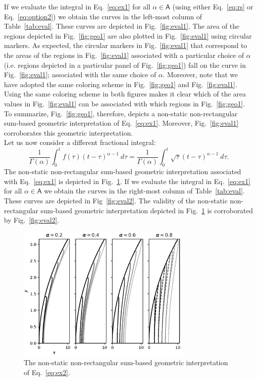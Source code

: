\documentclass{article}
\theoremstyle{theorem}
\theoremstyle{definition}
\begin{document}
\noindent
If we evaluate the integral in Eq.~\eqref{eq:ex1} for all $\alpha\in \mathsf{A}$ (using either Eq.~\eqref{eq:rs} or Eq.~\eqref{eq:option2}) we obtain the curves in the 
left-most column of Table~\ref{tab:eval}. These curves are depicted in Fig.~\ref{fig:eval1}.
The area of the regions depicted in Fig.~\ref{fig:geo1} are also plotted in Fig.~\ref{fig:eval1} using circular markers. As expected, the circular markers in Fig.~\ref{fig:eval1} that correspond to the areas of the regions in Fig.~\ref{fig:eval1}  
associated with a particular choice of $\alpha$ (i.e. regions depicted in a particular panel of Fig.~\ref{fig:geo1}) fall on the curve in Fig.~\ref{fig:eval1}; associated with the same choice of $\alpha$. Moreover, note that we have adopted the 
same coloring scheme in Fig.~\ref{fig:geo1} and Fig.~\ref{fig:eval1}. Using the same coloring scheme in both figures makes it clear which of the area values in Fig.~\ref{fig:eval1} can be associated with which regions in Fig.~\ref{fig:geo1}.
To summarize, Fig.~\ref{fig:geo1}, therefore, depicts a non-static non-rectangular sum-based geometric interpretation of Eq.~\eqref{eq:ex1}. Moreover, Fig.~\ref{fig:eval1} corroborates this 
geometric interpretation.\\

\noindent
Let us now consider a different fractional integral:
\begin{equation}
\label{eq:ex2}
\frac{1}{\Gamma(\alpha)}\int_0^t f(\tau) (t-\tau)^{\alpha-1}~d\tau = \frac{1}{\Gamma(\alpha)}\int_0^t \sqrt{\tau}(t-\tau)^{\alpha-1}~d\tau. 
\end{equation}
The non-static non-rectangular sum-based geometric interpretation associated with Eq.~\eqref{eq:ex1} is depicted in Fig.~\ref{fig:geo2}. 
If we evaluate the integral in Eq.~\eqref{eq:ex1} for all $\alpha\in \mathsf{A}$ we obtain the curves in the right-most column of Table~\ref{tab:eval}. 
These curves are depicted in Fig~\ref{fig:eval2}.
The validity of the non-static non-rectangular sum-based geometric interpretation depicted in Fig.~\ref{fig:geo2} is corroborated by Fig.~\ref{fig:eval2}. 

\begin{figure}[htb]
\centering
\includegraphics[width=0.75\textwidth]{geo_int2.eps}
\caption{The non-static non-rectangular sum-based geometric interpretation of Eq.~\eqref{eq:ex2}.}
\label{fig:geo2}
\end{figure}
\end{document}
